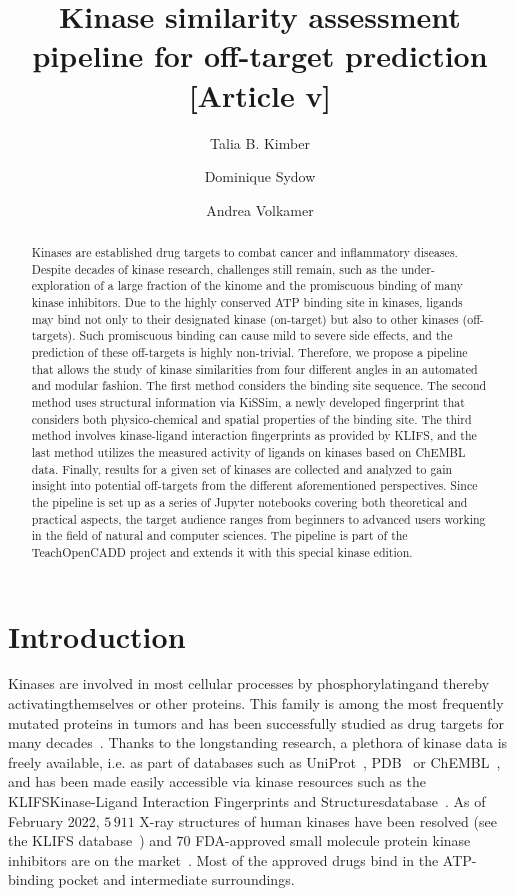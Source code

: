 \documentclass[9pt,training]{livecoms}
\title{Kinase similarity assessment pipeline for off-target prediction [Article v\versionnumber]}
\author[1\authfn{1}]{Talia B. Kimber}
\author[1\authfn{1}\authfn{2}]{Dominique Sydow}
\author[1*]{Andrea Volkamer}
\affil[1]{\textit{In silico} Toxicology and Structural Bioinformatics, Institute of Physiology, Charit\'e-Universit\"atsmedizin Berlin, Charit\'eplatz 1, 10117, Berlin, Germany}
\begin{document}
\begin{frontmatter}
\maketitle

\begin{abstract}
Kinases are established drug targets to combat cancer and inflammatory diseases. Despite decades of kinase research, challenges still remain, such as the under-exploration of a large fraction of the kinome and the promiscuous binding of many kinase inhibitors. Due to the highly conserved ATP binding site in kinases, ligands may bind not only to their designated kinase (on-target) but also to other kinases (off-targets). Such promiscuous binding can cause mild to severe side effects, and the prediction of these off-targets is highly non-trivial.
Therefore, we propose a pipeline that allows the study of kinase similarities from four different angles in an automated and modular fashion. The first method considers the binding site sequence. The second method uses structural information via KiSSim, a newly developed fingerprint that considers both physico-chemical and spatial properties of the binding site. The third method involves kinase-ligand interaction fingerprints as provided by KLIFS, and the last method utilizes the measured activity of ligands on kinases based on ChEMBL data. Finally, results for a given set of kinases are collected and analyzed to gain insight into potential off-targets from the different aforementioned perspectives. Since the pipeline is set up as a series of Jupyter notebooks covering both theoretical and practical aspects, the target audience ranges from beginners to advanced users working in the field of natural and computer sciences. The pipeline is part of the TeachOpenCADD project and extends it with this special kinase edition.
\end{abstract}

\end{frontmatter}

\section{Introduction}
Kinases are involved in most cellular processes by phosphorylating\textemdash and thereby activating\textemdash themselves or other proteins. This family is among the most frequently mutated proteins in tumors and has been successfully studied as drug targets for many decades~\cite{Cohen_2021_NatRevDrugDiscov}. Thanks to the longstanding research, a plethora of kinase data is freely available, i.e. as part of databases such as UniProt~\cite{uniprot_consortium_2020_nar}, PDB~\cite{Berman_2000_NAR} or ChEMBL~\cite{Gaulton_2016_nar}, and has been made easily accessible via kinase resources such as the KLIFS\textemdash Kinase-Ligand Interaction Fingerprints and Structures\textemdash database~\cite{Kanev_2020_NAR}. As of February 2022, $5\,911$ X-ray structures of human kinases have been resolved (see the KLIFS database~\cite{klifs_feb_2022}) and $70$ FDA-approved small molecule protein kinase inhibitors are on the market~\cite{FDA_PKI_2022}. Most of the approved drugs bind in the ATP-binding pocket and intermediate surroundings.
\end{document}
